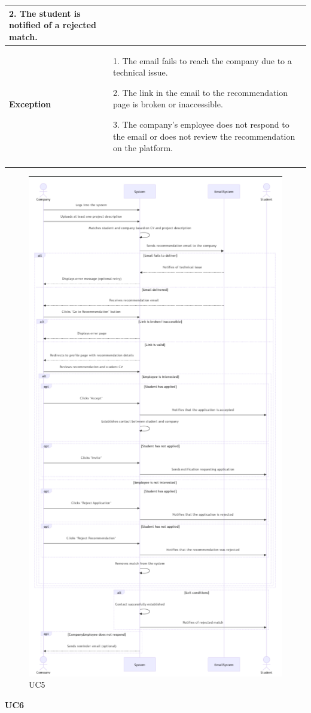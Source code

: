 \begin{longtable}{|p{}|p{}|}
2. The student is notified of a rejected match.\\
\hline
\textbf{Exception} &  
1. The email fails to reach the company due to a technical issue.

2. The link in the email to the recommendation page is broken or inaccessible.	

3. The company’s employee does not respond to the email or does not review the recommendation on the platform.	\\
\\
\hline
\end{longtable}

\begin{figure}[H]
    \centering
    \includegraphics[width=0.5\linewidth]{RASD//Images/UC5.png}
    \caption{UC5}
\end{figure}

\pagebreak
\textbf{UC6}

